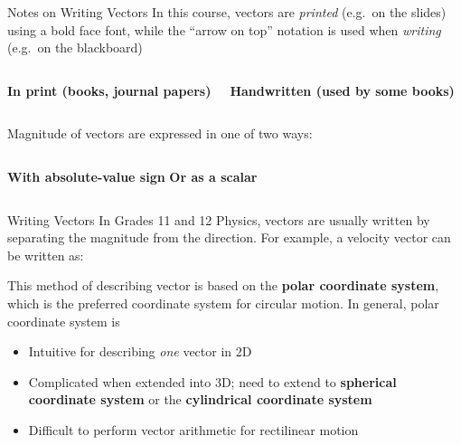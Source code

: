 \documentclass[12pt,compress,aspectratio=169]{beamer}
\newcommand{\mb}[1]{\ensuremath\mathbf{#1}}
\newcommand{\eq}[2]{\vspace{#1}{\Large\begin{displaymath}#2\end{displaymath}}}
\begin{document}
\begin{frame}{Notes on  Writing Vectors}
  In this course, vectors are \emph{printed} (e.g.\ on the slides) using a bold
  face font, while the ``arrow on top'' notation is used when \emph{writing}
  (e.g.\ on the blackboard)
  \vspace{.1in}
  \begin{columns}
    \textbf{In print (books, journal papers)}
    \vspace{-.2in}{\LARGE
      \begin{displaymath}
        \mb{v}\quad\mb{F}_g\quad\mb{p}\quad\mb{I}
      \end{displaymath}
    }
    
    \textbf{Handwritten (used by some books)}
  \end{columns}
  Magnitude of vectors are expressed in one of two ways:
  \vspace{.1in}
  \begin{columns}
    \textbf{With absolute-value sign}
    \vspace{-.2in}{\LARGE
      \begin{displaymath}
        |\mb{v}|\quad|\mb{F}_g|\quad|\mb{p}|\quad|\mb{I}|
      \end{displaymath}
    }
    \textbf{Or as a scalar}
      \vspace{-.2in}{\LARGE
        \begin{displaymath}
          v\quad F_g\quad p \quad I
        \end{displaymath}
      }
  \end{columns}
\end{frame}


\begin{frame}{Writing Vectors}
  In Grades 11 and 12 Physics, vectors are usually written by separating the
  magnitude from the direction. For example, a velocity vector can be written
  as:
  
  \eq{-.2in}{
    \mb{v}=\SI{4.5}{\metre\per\second}\text{ [N $55^\circ$ E]}
  }
  
  \vspace{-.15in}This method of describing vector is based on the
  \textbf{polar coordinate system}, which is the preferred coordinate system
  for circular motion. In general, polar coordinate system is
  \begin{itemize}
  \item Intuitive for describing \emph{one} vector in 2D
  \item Complicated when extended into 3D; need to extend to
    \textbf{spherical coordinate system} or the
    \textbf{cylindrical coordinate system}
  \item Difficult to perform vector arithmetic for rectilinear motion
  \end{itemize}
\end{frame}
\end{document}
